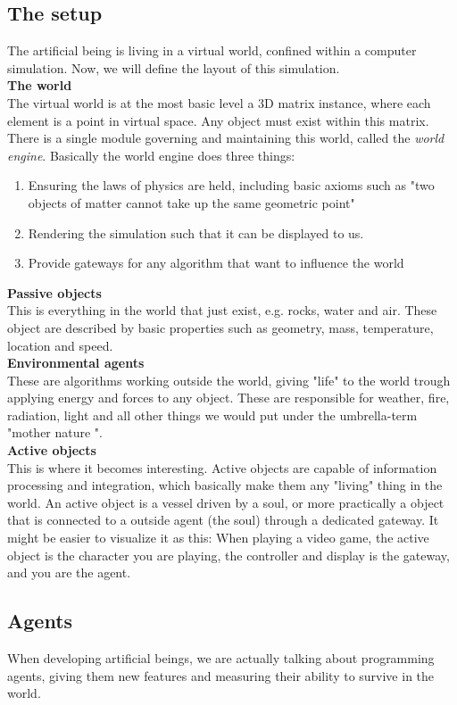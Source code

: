 \documentclass{article}
\newcommand{\sidenote}[1]{\textit{#1}\marginnote{\textbf{#1}}}
\begin{document}
	\subsection{The setup}
	The artificial being is living in a virtual world, confined within a computer simulation. Now, we will define the layout of this simulation.\\
	\textbf{The world}\\
	The virtual world is at the most basic level a 3D matrix instance, where each element is a point in virtual space. Any object must exist within this matrix. There is a single module governing and maintaining this world, called the \sidenote{world engine}. Basically the world engine does three things:
	\begin{enumerate}
		\item Ensuring the laws of physics are held, including basic axioms such as "two objects of matter cannot take up the same geometric point"
		\item Rendering the simulation such that it can be displayed to us.
		\item Provide gateways for any algorithm that want to influence the world
	\end{enumerate}
	\textbf{Passive objects}\\
	This is everything in the world that just exist, e.g. rocks, water and air. These object are described by basic properties such as geometry, mass, temperature, location and speed.\\
	\textbf{Environmental agents}\\
	These are algorithms working outside the world, giving "life" to the world  trough applying energy and forces to any object. These are responsible for weather, fire, radiation, light and all other things we would put under the umbrella-term "mother nature ". \\
	\textbf{Active objects}\\
	This is where it becomes interesting. Active objects are capable of information processing and integration, which basically make them any "living" thing in the world. An active object is a vessel driven by a soul, or more practically a object that is connected to a outside agent (the soul) through a dedicated gateway. It might be easier to visualize it as this: When playing a video game, the active object is the character you are playing, the controller and display is the gateway, and you are the agent.
	
	\subsection{Agents}
	When developing artificial beings, we are actually talking about programming agents, giving them new features and measuring their ability to survive in the world. 
	
\end{document}
